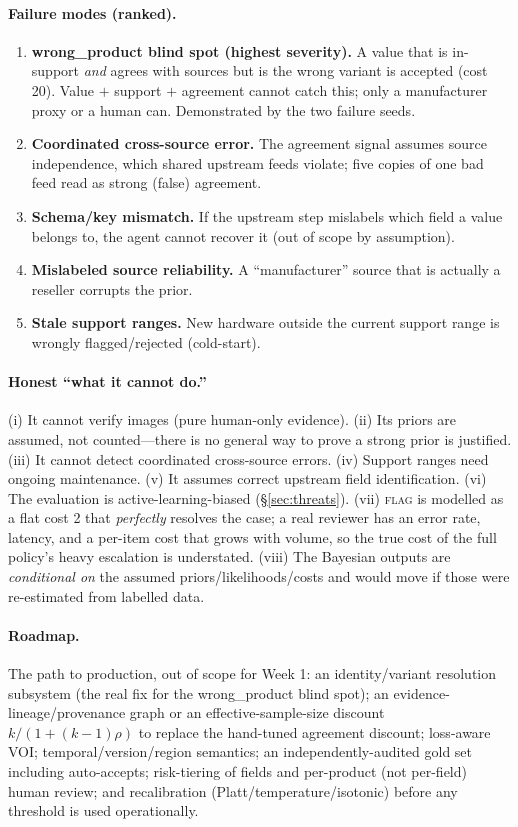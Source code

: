 \documentclass[11pt]{article}
\begin{document}
\paragraph{Failure modes (ranked).}
\begin{enumerate}[nosep]
  \item \textbf{\textsf{wrong\_product} blind spot (highest severity).} A value that is
        in-support \emph{and} agrees with sources but is the wrong variant is accepted
        (cost 20). Value $+$ support $+$ agreement cannot catch this; only a
        manufacturer proxy or a human can. Demonstrated by the two failure seeds.
  \item \textbf{Coordinated cross-source error.} The agreement signal assumes source
        independence, which shared upstream feeds violate; five copies of one bad feed
        read as strong (false) agreement.
  \item \textbf{Schema/key mismatch.} If the upstream step mislabels which field a value
        belongs to, the agent cannot recover it (out of scope by assumption).
  \item \textbf{Mislabeled source reliability.} A ``manufacturer'' source that is
        actually a reseller corrupts the prior.
  \item \textbf{Stale support ranges.} New hardware outside the current support range is
        wrongly flagged/rejected (cold-start).
\end{enumerate}

\paragraph{Honest ``what it cannot do.''}
(i) It cannot verify images (pure human-only evidence).
(ii) Its priors are assumed, not counted---there is no general way to prove a strong
prior is justified.
(iii) It cannot detect coordinated cross-source errors.
(iv) Support ranges need ongoing maintenance.
(v) It assumes correct upstream field identification.
(vi) The evaluation is active-learning-biased (\S\ref{sec:threats}).
(vii) \textsc{flag} is modelled as a flat cost 2 that \emph{perfectly} resolves the
case; a real reviewer has an error rate, latency, and a per-item cost that grows with
volume, so the true cost of the full policy's heavy escalation is understated.
(viii) The Bayesian outputs are \emph{conditional on} the assumed priors/likelihoods/costs
and would move if those were re-estimated from labelled data.

\paragraph{Roadmap.} The path to production, out of scope for Week 1: an identity/variant
resolution subsystem (the real fix for the \textsf{wrong\_product} blind spot); an
evidence-lineage/provenance graph or an effective-sample-size discount
$k/(1+(k-1)\rho)$ to replace the hand-tuned agreement discount; loss-aware VOI;
temporal/version/region semantics; an independently-audited gold set including
auto-accepts; risk-tiering of fields and per-product (not per-field) human review; and
recalibration (Platt/temperature/isotonic) before any threshold is used operationally.
\end{document}

